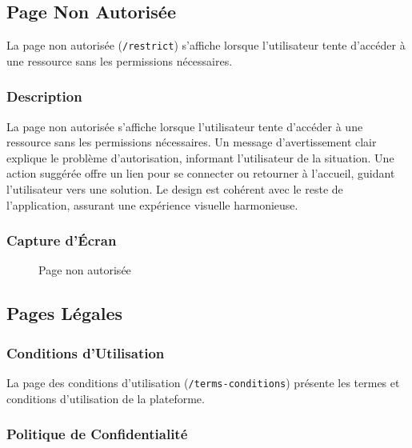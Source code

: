 \documentclass[12pt,a4paper]{article}
\begin{document}
\subsection{Page Non Autorisée}

La page non autorisée (\texttt{/restrict}) s'affiche lorsque l'utilisateur tente d'accéder à une ressource sans les permissions nécessaires.

\subsubsection{Description}

La page non autorisée s'affiche lorsque l'utilisateur tente d'accéder à une ressource sans les permissions nécessaires. Un message d'avertissement clair explique le problème d'autorisation, informant l'utilisateur de la situation. Une action suggérée offre un lien pour se connecter ou retourner à l'accueil, guidant l'utilisateur vers une solution. Le design est cohérent avec le reste de l'application, assurant une expérience visuelle harmonieuse.

\subsubsection{Capture d'Écran}

\begin{figure}[H]
    \centering
    \caption{Page non autorisée}
    \label{fig:unauthorized}
\end{figure}

\subsection{Pages Légales}

\subsubsection{Conditions d'Utilisation}

La page des conditions d'utilisation (\texttt{/terms-conditions}) présente les termes et conditions d'utilisation de la plateforme.

\subsubsection{Politique de Confidentialité}
\end{document}
